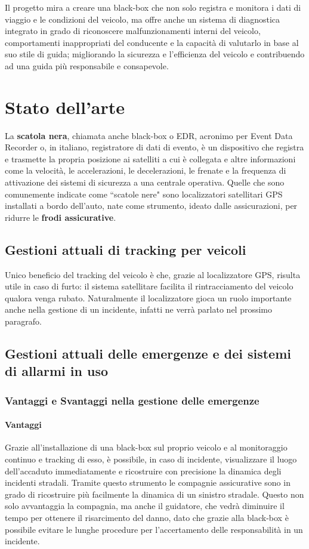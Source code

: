 \documentclass[12pt, a4paper, italian]{report}
\numberwithin{figure}{chapter}
\numberwithin{table}{chapter}
\begin{document}
\vspace{1cm}

Il progetto mira a creare una black-box che non solo registra e monitora i dati di viaggio e le condizioni del veicolo, ma offre anche un sistema di diagnostica integrato in grado di riconoscere malfunzionamenti interni del veicolo, comportamenti inappropriati del conducente e la capacità di valutarlo in base al suo stile di guida; migliorando la sicurezza e l’efficienza del veicolo e contribuendo ad una guida più responsabile e consapevole.

\chapter{Stato dell'arte}
La \textbf{scatola nera}, chiamata anche black-box o EDR, acronimo per Event Data Recorder o, in italiano, registratore di dati di evento, è un dispositivo che registra e trasmette la propria posizione ai satelliti a cui è collegata e altre informazioni come la velocità, le accelerazioni, le decelerazioni, le frenate e la frequenza di attivazione dei sistemi di sicurezza a una centrale operativa.
Quelle che sono comunemente indicate come ``scatole nere" sono localizzatori satellitari GPS installati a bordo dell'auto, nate come strumento, ideato dalle assicurazioni, per ridurre le \textbf{frodi assicurative}.
\section{Gestioni attuali di tracking per veicoli}
Unico beneficio del tracking del veicolo è che, grazie al localizzatore GPS, risulta utile in caso di furto: il sistema satellitare facilita il rintracciamento del veicolo qualora venga rubato. Naturalmente il localizzatore gioca un ruolo importante anche nella gestione di un incidente, infatti ne verrà parlato nel prossimo paragrafo.
\section{Gestioni attuali delle emergenze e dei sistemi di allarmi in uso}
\subsection{Vantaggi e Svantaggi nella gestione delle emergenze}
\subsubsection{Vantaggi}
Grazie all'installazione di una black-box sul proprio veicolo e al monitoraggio continuo e tracking di esso, è possibile, in caso di incidente, visualizzare il luogo dell'accaduto immediatamente e ricostruire con precisione la dinamica degli incidenti stradali. Tramite questo strumento le compagnie assicurative sono in grado di ricostruire più facilmente la dinamica di un sinistro stradale. Questo non solo avvantaggia la compagnia, ma anche il guidatore, che vedrà diminuire il tempo per ottenere il risarcimento del danno, dato che grazie alla black-box è possibile evitare le lunghe procedure per l'accertamento delle responsabilità in un incidente.
\end{document}
